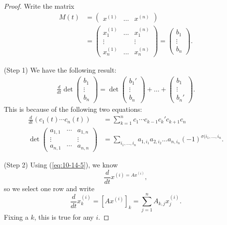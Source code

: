 \documentclass{tufte-handout}
\theoremstyle{definition}
\begin{document}
\begin{proof}
	Write the matrix 
	\begin{align*}
		M(t) &= \begin{pmatrix}
			x^{(1)} & \ldots & x^{(n)}
		\end{pmatrix} \\
&= \begin{pmatrix}
			x_1^{(1)} & \ldots & x_1^{(n)} \\
			\vdots & & \vdots \\
			x_n^{(1)} & \ldots & x_n^{(n)}
		\end{pmatrix}  = \begin{pmatrix}
		b_1 \\
		\vdots \\
		b_n
		\end{pmatrix}
	.\end{align*}

	(Step 1) We have the following result:
	\begin{align*}
		\frac{d}{dt} \det \begin{pmatrix}
		b_1 \\
		\vdots \\
		b_n
		\end{pmatrix}  = \det \begin{pmatrix}
		b_1' \\
		\vdots \\
		b_n
		\end{pmatrix} + \ldots + \begin{pmatrix}
		b_1 \\
		\vdots \\
		b_n'
		\end{pmatrix} 
	.\end{align*} This is because of the following two equations: 
	\begin{align*}
		\frac{d}{dt} (c_1(t) \cdots c_n(t)) &= \sum\limits_{k=1}^{n} c_1 \cdots c_{k-1} c_k' c_{k+1} c_n \\
		\det \begin{pmatrix}
			a_{1,1} & \cdots & a_{1,n} \\
			\vdots & & \vdots \\
			a_{n,1} & \cdots & a_{n,n}
		\end{pmatrix} &= \sum\limits_{i_1,\ldots,i_n}^{} a_{1,i_1}a_{2,i_2} \ldots a_{n, i_n} (-1)^{\sigma(i_1,\ldots, i_n}
	.\end{align*}

	(Step 2) Using (\ref{eq:10-14-5}), we know \[
		\frac{d}{dt}x^{(i) = Ax^{(i)}}
	,\] so we select one row and write \[
		\frac{d}{dt}x^{(i)}_k = \left[ Ax^{(i)} \right]_k = \sum\limits_{j=1}^{n} A_{k,j} x_j^{(i)}
	.\] Fixing a $k$, this is true for any $i$.


\end{proof}
\end{document}
